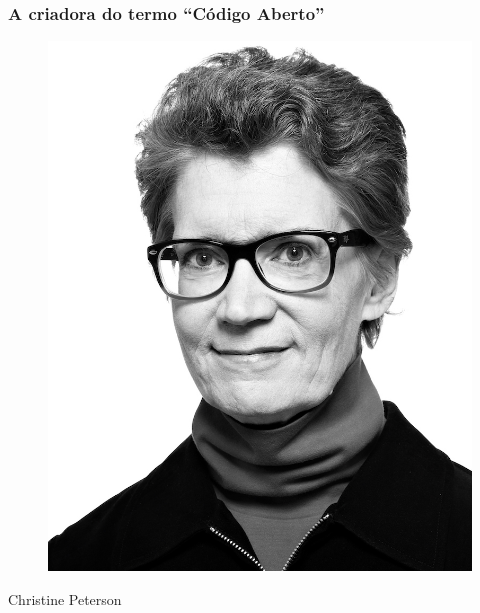 \documentclass[xcolor=dvipsnames]{beamer}
\begin{document}
\begin{frame}
	\frametitle{A criadora do termo ``Código Aberto''}

	\begin{figure}
	\includegraphics[scale=0.2]{christinepeterson.jpg}
	\end{figure}
\begin{center}Christine Peterson\end{center}
\end{frame}
\end{document}

